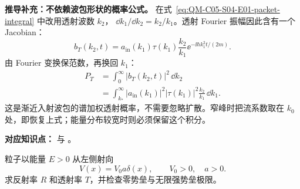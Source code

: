 \begin{checkedsolution}
\textbf{推导补充：不依赖波包形状的概率公式。}
在式~\eqref{eq:QM-C05-S04-E01-packet-integral} 中改用透射波数 $k_2$，
$\dd k_1/\dd k_2=k_2/k_1$。透射 Fourier 振幅因此含有一个 Jacobian：
\begin{equation}
  b_T(k_2,t)=a_{\mathrm{in}}(k_1)\tau(k_1)
    \frac{k_2}{k_1}\ee^{-\ii\hbar k_1^2t/(2m)}.
\end{equation}
由 Fourier 变换保范数，再换回 $k_1$：
\begin{align}
  P_T&=\int_0^\infty|b_T(k_2,t)|^2\,\dd k_2\\
     &=\int_{k_*}^\infty
       |a_{\mathrm{in}}(k_1)|^2|\tau(k_1)|^2
       \frac{k_2}{k_1}\,\dd k_1.
  \label{eq:QM-C05-S04-E01-spectral-probability}
\end{align}
这是渐近入射波包的谱加权透射概率，不需要忽略扩散。窄峰时把流系数取在 $k_0$ 处，即恢复上式；能量分布较宽时则必须保留这个积分。
\end{checkedsolution}


\textbf{对应知识点：}
与
。

粒子以能量 $E>0$ 从左侧射向
\begin{equation}
  V(x)=V_0a\delta(x),
  \qquad V_0>0,\quad a>0.
  \label{eq:QM-C05-S04-E02A-potential}
\end{equation}
求反射率 $R$ 和透射率 $T$，并检查零势垒与无限强势垒极限。

